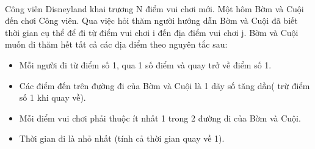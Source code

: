  

Công viên Disneyland khai trương N điểm vui chơi mới. Một hôm Bờm và Cuội đến chơi Công viên. Qua việc hỏi thăm người hướng dẫn Bờm và Cuội đã biết thời gian cụ thể để đi từ điểm vui chơi i đến địa điểm vui chơi j. Bờm và Cuội muốn đi thăm hết tất cả các địa điểm theo nguyên tắc sau:
\begin{itemize}
	\item Mỗi người đi từ điểm số 1, qua 1 số điểm và quay trở về điểm số 1.
	\item Các điểm đến trên đường đi của Bờm và Cuội là 1 dãy số tăng dần( trừ điểm số 1 khi quay về).
	\item Mỗi điểm vui chơi phải thuộc ít nhất 1 trong 2 đường đi của Bờm và Cuội.
	\item Thời gian đi là nhỏ nhất (tính cả thời gian quay về 1).
\end{itemize}